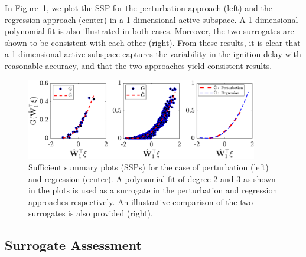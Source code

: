 In Figure~\ref{fig:hd}, we plot the SSP for the perturbation approach (left) and the regression
approach (center) in a 1-dimensional active subspace. A 1-dimensional polynomial fit is also
illustrated in both cases. Moreover, the two surrogates are shown to be consistent with each other (right).
From these results, it is clear that a 1-dimensional active subspace captures the variability in the
ignition delay with reasonable accuracy, and that the two approaches yield consistent results.
%
\begin{figure}[htbp]
 \begin{center}
   \includegraphics[width=0.9\textwidth]{SSP_plot36Dp2}
\caption{Sufficient summary plots (SSPs) for the case of perturbation (left) and regression (center).
A polynomial fit of degree 2 and 3 as shown in the plots is used as a surrogate in the 
perturbation and regression approaches respectively. An illustrative comparison of the two
surrogates is also provided (right).}
\label{fig:hd}
\end{center}
\end{figure}
%

\subsection{Surrogate Assessment}
\label{sub:verify}

